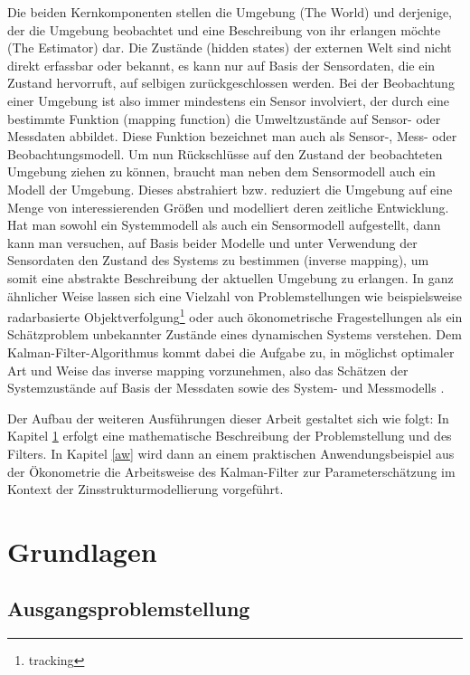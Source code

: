 \documentclass[12pt,a4paper,headsepline,bibliography=totoc,listof=totoc,headinclude=false,footinclude=false,BCOR5mm]{scrreprt} %
\begin{document}
Die beiden Kernkomponenten stellen die Umgebung (The World) und derjenige, der die Umgebung beobachtet und  eine Beschreibung von ihr erlangen m\"ochte (The Estimator) dar. Die Zust\"ande (hidden states) der externen Welt sind nicht direkt erfassbar oder bekannt, es kann nur auf Basis der Sensordaten, die ein Zustand hervorruft, auf selbigen zur\"uckgeschlossen werden. 
Bei der Beobachtung einer Umgebung ist also immer mindestens ein Sensor involviert, der durch eine bestimmte Funktion (mapping function) die Umweltzust\"ande auf Sensor- oder Messdaten 
abbildet.  Diese Funktion bezeichnet man auch als Sensor-, Mess- oder Beobachtungsmodell. Um nun R\"uckschl\"usse auf den Zustand der beobachteten Umgebung ziehen zu k\"onnen, braucht man neben dem Sensormodell auch ein Modell der Umgebung. Dieses abstrahiert 
bzw. reduziert die Umgebung auf eine Menge von interessierenden Gr\"o{\ss}en und modelliert 
deren zeitliche Entwicklung. Hat man sowohl ein Systemmodell als auch ein Sensormodell aufgestellt, dann kann man versuchen, auf Basis beider Modelle und unter Verwendung der Sensordaten den Zustand des 
Systems zu bestimmen (inverse mapping), um somit eine abstrakte Beschreibung der 
aktuellen Umgebung zu erlangen. In ganz \"ahnlicher Weise lassen sich eine Vielzahl von Problemstellungen wie beispielsweise radarbasierte Objektverfolgung\footnote{tracking} oder auch {\"o}konometrische Fragestellungen als ein Sch\"atzproblem unbekannter Zust\"ande eines dynamischen Systems verstehen. Dem Kalman-Filter-Algorithmus kommt dabei die Aufgabe zu, in m{\"o}glichst optimaler Art und Weise das inverse mapping vorzunehmen, also das Sch{\"a}tzen der Systemzust{\"a}nde auf Basis der Messdaten sowie des System- und Messmodells \cite{Anderson1992}.

Der Aufbau der weiteren Ausf{\"u}hrungen dieser Arbeit gestaltet sich wie folgt: In Kapitel \ref{gl} erfolgt eine mathematische Beschreibung der Problemstellung und des Filters. In Kapitel \ref{aw} wird dann an einem praktischen Anwendungsbeispiel aus der \"Okonometrie die Arbeitsweise des Kalman-Filter zur Parametersch{\"a}tzung im Kontext der Zinsstrukturmodellierung vorgeführt.

\chapter{Grundlagen}\label{gl}
\section{Ausgangsproblemstellung}\label{problem}
\end{document}
